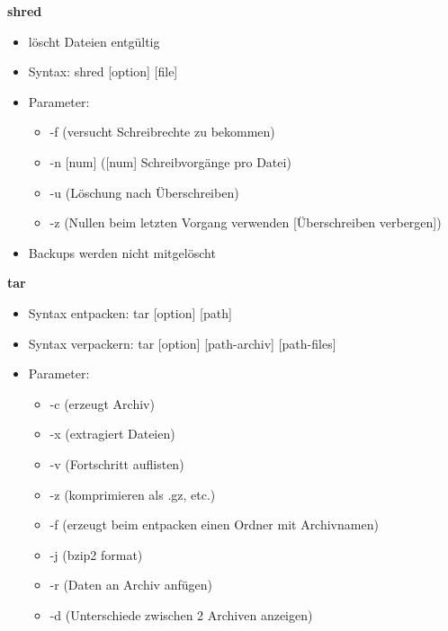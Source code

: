 \documentclass[12pt,utf8, 10pt]{article}
\begin{document}
\textbf{shred}
\begin{itemize}
	\item löscht Dateien entgültig
	\item Syntax: shred [option] [file]
	\item Parameter:
	\begin{itemize}
		\item -f (versucht Schreibrechte zu bekommen)
		\item -n [num] ([num] Schreibvorgänge pro Datei)
		\item -u (Löschung nach Überschreiben)
		\item -z (Nullen beim letzten Vorgang verwenden [Überschreiben verbergen])
	\end{itemize}
	\item Backups werden nicht mitgelöscht
\end{itemize}

\textbf{tar}
\begin{itemize}
	\item Syntax entpacken: tar [option] [path]
	\item Syntax verpackern: tar [option] [path-archiv] [path-files]
	\item Parameter:
	\begin{itemize}
		\item -c (erzeugt Archiv)
		\item -x (extragiert Dateien)
		\item -v (Fortschritt auflisten)
		\item -z (komprimieren als .gz, etc.)
		\item -f (erzeugt beim entpacken einen Ordner mit Archivnamen)
		\item -j (bzip2 format)
		\item -r (Daten an Archiv anfügen)
		\item -d (Unterschiede zwischen 2 Archiven anzeigen)
	\end{itemize}
\end{itemize}
\end{document}
